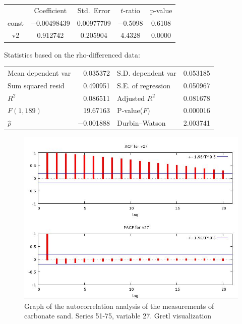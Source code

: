 \documentclass[10pt, a4paper]{article}
\begin{document}
\begin{appendices}
\begin{table}
\begin{center}
\vspace{1em}

\begin{tabular}{|c c c c c|}
  & {Coefficient} &  {Std.\ Error} & {$t$-ratio} &   {p-value} \\[1ex]
const &   $-$0.00498439 &     0.00977709 &       $-$0.5098 &         0.6108 \\
v2 &   0.912742 &     0.205904 &      4.4328 &         0.0000 \\
\end{tabular}

\vspace{1em}Statistics based on the rho-differenced data:

\vspace{1ex}
\begin{tabular}{lrlr}
Mean dependent var &  0.035372 & S.D. dependent var &  0.053185 \\
Sum squared resid &  0.490951 & S.E. of regression &  0.050967 \\
$R^2$ &  0.086511 & Adjusted $R^2$ &  0.081678 \\
$F(1, 189)$ &  19.67163 & P-value($F$) &  0.000016 \\
$\hat{\rho}$ & $-$0.001888 & Durbin--Watson &  2.003741 \\
\end{tabular}
\end{center}
\end{table}
\pagebreak

\begin{figure}[H]
\begin{center}
\includegraphics[scale=0.4]{G-autocorr-sand51-75.jpg}
\caption{Graph of the autocorrelation analysis of the measurements of carbonate sand. Series 51-75, variable 27. Gretl visualization­}
\label{fig:57}
\end{center}
\end{figure}


\end{appendices}
\end{document}
